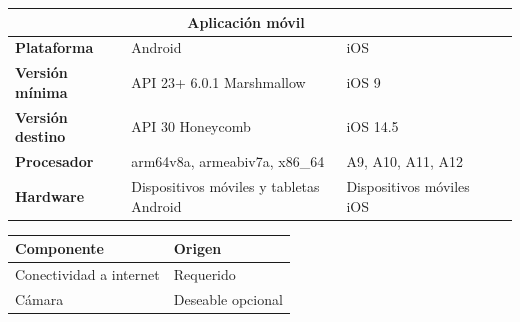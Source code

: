 \documentclass[10pt]{article}
\begin{document}
\begin{table}[ht]
    \centering
    \begin{tabular}{|l |l |l |l |l |}
        \hline
        \multicolumn{3}{|c|}{\textbf{Aplicación móvil}}                                                             \\
        \hline
        \centering\textbf{Plataforma}      & {Android}                                 & {iOS}                      \\ \hline
        \centering\textbf{Versión mínima}  & {API 23+ 6.0.1 Marshmallow}               & {iOS 9}                    \\ \hline
        \centering\textbf{Versión destino} & {API 30 Honeycomb}                        & {iOS 14.5}                 \\ \hline
        \centering\textbf{Procesador}      & {arm64\-v8a, armeabi\-v7a, x86\_64}       & {A9, A10, A11, A12}        \\ \hline
        \centering\textbf{Hardware}        & {Dispositivos móviles y tabletas Android} & {Dispositivos móviles iOS} \\ \hline
    \end{tabular}
\end{table}
\begin{table}[H]
    \begin{center}
        \begin{tabular}{| l | l |}
            \hline
            \textbf{Componente}     & \textbf{Origen}   \\ \hline
            Conectividad a internet & Requerido         \\
            Cámara                  & Deseable opcional \\ \hline
        \end{tabular}
    \end{center}
\end{table}
\end{document}
